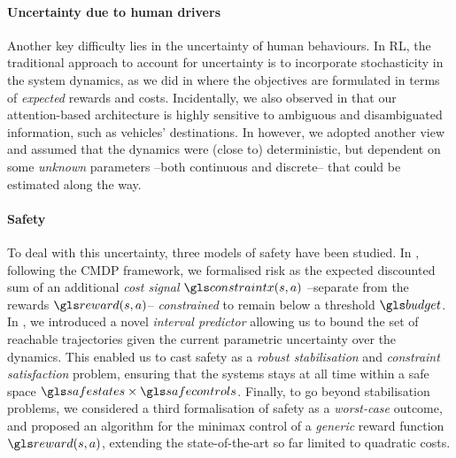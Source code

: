 \paragraph{Uncertainty due to human drivers}
Another key difficulty lies in the uncertainty of human behaviours. In \gls{RL}, the traditional approach to account for uncertainty is to incorporate stochasticity in the system dynamics, as we did in  where the objectives are formulated in terms of \emph{expected} rewards and costs. Incidentally, we also observed in  that our attention-based architecture is highly sensitive to ambiguous and disambiguated information, such as vehicles' destinations. In  however, we adopted another view and assumed that the dynamics were (close to) deterministic, but dependent on some \emph{unknown} parameters --both continuous and discrete-- that could be estimated along the way.

\paragraph{Safety}
To deal with this uncertainty, three models of safety have been studied. In , following the \gls{CMDP} framework, we formalised risk as the expected discounted sum of an additional \emph{cost signal} $\constraint(s,a)$ --separate from the rewards $\reward(s,a)$-- \emph{constrained} to remain below a threshold $\budget$. In , we introduced a novel \emph{interval predictor} allowing us to bound the set of reachable trajectories given the current parametric uncertainty over the dynamics. This enabled us to cast safety as a \emph{robust stabilisation} and \emph{constraint satisfaction} problem, ensuring that the systems stays at all time within a safe space $\safestates\times\safecontrols$. Finally, to go beyond stabilisation problems, we considered a third formalisation of safety as a \emph{worst-case} outcome, and proposed an algorithm for the minimax control of a \emph{generic} reward function $\R(s,a)$, extending the state-of-the-art so far limited to quadratic costs.

